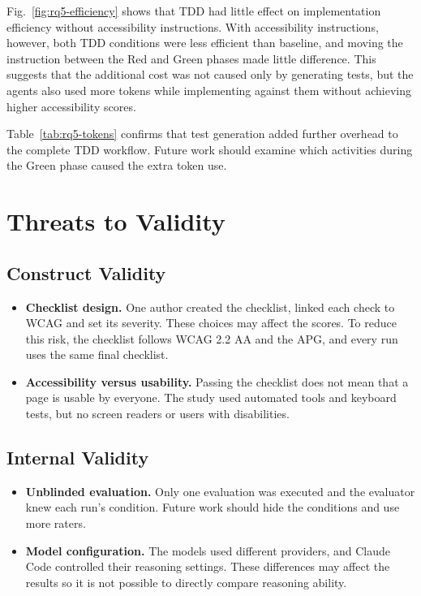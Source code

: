 \documentclass[conference]{IEEEtran}
\begin{document}
Fig.~\ref{fig:rq5-efficiency} shows that TDD had little effect on implementation efficiency without accessibility instructions. With accessibility instructions, however, both TDD conditions were less efficient than baseline, and moving the instruction between the Red and Green phases made little difference. This suggests that the additional cost was not caused only by generating tests, but the agents also used more tokens while implementing against them without achieving higher accessibility scores.

Table~\ref{tab:rq5-tokens} confirms that test generation added further overhead to the complete TDD workflow. Future work should examine which activities during the Green phase caused the extra token use.

\section{Threats to Validity}

\subsection{Construct Validity}

\begin{itemize}
  \item \textbf{Checklist design.} One author created the checklist, linked each check to WCAG and set its severity. These choices may affect the scores. To reduce this risk, the checklist follows WCAG 2.2 AA and the APG, and every run uses the same final checklist.
  \item \textbf{Accessibility versus usability.} Passing the checklist does not mean that a page is usable by everyone. The study used automated tools and keyboard tests, but no screen readers or users with disabilities.
\end{itemize}

\subsection{Internal Validity}

\begin{itemize}
  \item \textbf{Unblinded evaluation.} Only one evaluation was executed and the evaluator knew each run's condition. Future work should hide the conditions and use more raters.
  \item \textbf{Model configuration.} The models used different providers, and Claude Code controlled their reasoning settings. These differences may affect the results so it is not possible to directly compare reasoning ability.
\end{itemize}
\end{document}
